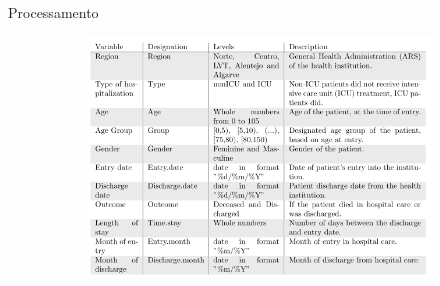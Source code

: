 \documentclass[pdf]
{beamer}
\begin{document}
\begin{frame}{Processamento}
\begin{figure}[!ht]
\begin{subfigure}{0.38\textwidth}
    \includegraphics[width=\textwidth, valign=m]{Imagens/Dados_Processados.png}
\end{subfigure}
\end{figure}
\end{frame}
\end{document}
